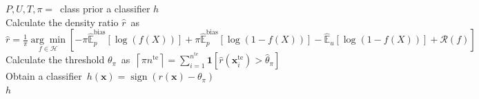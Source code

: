 \documentclass{article}
\begin{document}
\begin{algorithm}[!h]
\renewcommand{\algorithmicrequire}{\textbf{Input:}} %
\renewcommand{\algorithmicensure}{\textbf{Output:}} %
	\caption{PUSB} %
	\begin{algorithmic}[1] %
	    \REQUIRE
	    $P,U,T,\pi=$\ class prior
	    \ENSURE
	    a classifier $h$ \\
		\STATE Calculate the density ratio $\hat{r}$\ as\ $\hat{r}=\frac{1}{\pi} \underset{f\in \mathcal{H}}{\arg \min}\left[-\pi \hat{\mathbb{E}}_{p}^{\mathrm{bias}}[\log (f(X))]+\pi \hat{\mathbb{E}}_{p}^{\mathrm{bias}}[\log (1-f(X))]-\hat{\mathbb{E}}_{u}[\log(1-f(X))]+\mathcal{R}(f)\right]$ \\
		\STATE Calculate the threshold ${\theta}_{\pi}$\ as\ $\left\lceil\pi n^{\mathrm{te}}\right\rceil=\sum_{i=1}^{n^{\mathrm{te}}} \mathbf{1}\left[\hat{r}\left(\boldsymbol{x}_{i}^{\mathrm{te}}\right)>\hat{\theta}_{\pi}\right]$ \\
		\STATE Obtain a classifier\ $h(\boldsymbol{x})=\operatorname{sign}\left(r(\boldsymbol{x})-\theta_{\pi}\right)$ \\
		\RETURN $h$ \\
	\end{algorithmic}
\end{algorithm}
\end{document}

